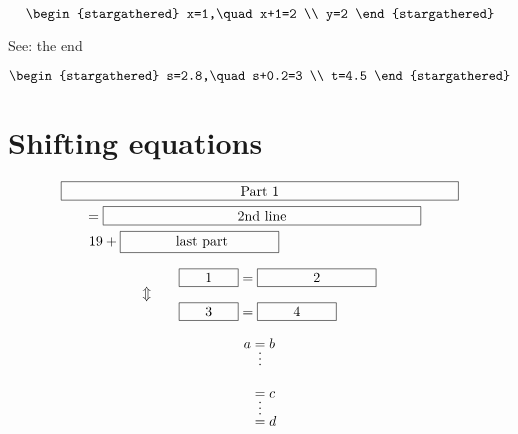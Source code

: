 \documentclass{article}
\begin{document}
\[
  \begin{stargathered}
    x=1,\quad x+1=2 \\
    y=2
  \end{stargathered}
\]
\thesteplinecnt

  {See:}%
  {the end}%
  {\setcounter{steplinecnt}{1337}}

\[
  \begin{stargathered}
    s=2.8,\quad s+0.2=3 \\
    t=4.5
  \end{stargathered}
\]
\thesteplinecnt

\section{Shifting equations}
\begin{align*}
\MoveEqLeft[3] \framebox[10cm][c]{Part 1}\\
= {} & \framebox[8cm][c]{2nd line}\\
19
& + \framebox[4cm][c]{ last part}
\end{align*}

\begin{alignat}{2}
&& \framebox[1.5cm]{1} &= \framebox[3cm]{2}\\
\ArrowBetweenLines
&& \framebox[1.5cm]{3} &= \framebox[2cm]{4}
\end{alignat}

\begin{align*}
a &= b              \\
\MTFlushSpaceAbove
& \vdotswithin{=} \\
\MTFlushSpaceBelow
& = c             \\
\shortvdotswithin{=}
& = d
\end{align*}
\end{document}
